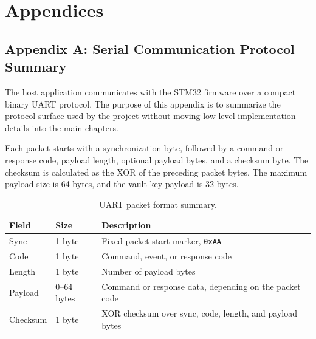 \chapter*{Appendices}

\section*{Appendix A: Serial Communication Protocol Summary}
\setcounter{table}{0}
\renewcommand{\thetable}{A.\arabic{table}}

The host application communicates with the STM32 firmware over a compact binary UART protocol. The purpose of this appendix is to summarize the protocol surface used by the project without moving low-level implementation details into the main chapters.

Each packet starts with a synchronization byte, followed by a command or response code, payload length, optional payload bytes, and a checksum byte. The checksum is calculated as the XOR of the preceding packet bytes. The maximum payload size is 64 bytes, and the vault key payload is 32 bytes.

\begin{table}[!htbp]
\centering
\caption{\label{tab:appendix-uart-packet}UART packet format summary.}
\begin{tabularx}{\textwidth}{lXX}
\toprule
Field & Size & Description\\
\midrule
Sync & 1 byte & Fixed packet start marker, \texttt{0xAA}\\
Code & 1 byte & Command, event, or response code\\
Length & 1 byte & Number of payload bytes\\
Payload & 0--64 bytes & Command or response data, depending on the packet code\\
Checksum & 1 byte & XOR checksum over sync, code, length, and payload bytes\\
\bottomrule
\end{tabularx}
\end{table}

